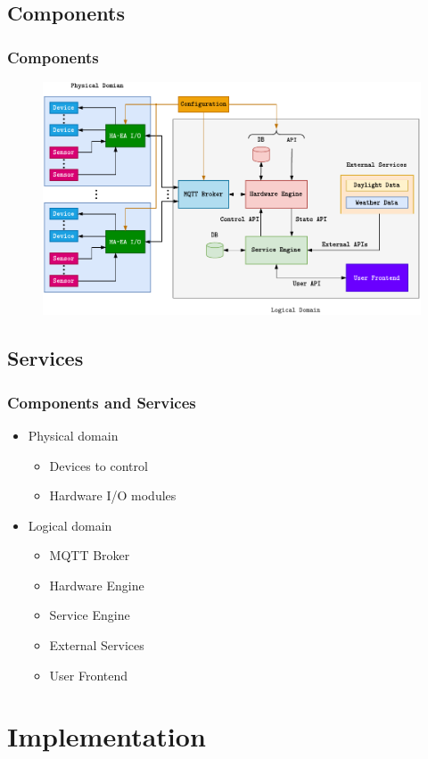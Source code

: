 \documentclass[aspectratio=169]{beamer}
\begin{document}
\subsection{Components}
\begin{frame}
\frametitle{Components}
\begin{figure}
\includegraphics[width=0.65\linewidth]{./figures/specification.pdf}
\end{figure}
\end{frame}

\subsection{Services}
\begin{frame}
\frametitle{Components and Services}
\begin{itemize}
\item Physical domain
\begin{itemize}
\item Devices to control
\item Hardware I/O modules
\end{itemize}
\item Logical domain
\begin{itemize}
\item MQTT Broker
\item Hardware Engine
\item Service Engine
\item External Services
\item User Frontend
\end{itemize}
\end{itemize}
\end{frame}


\section{Implementation}
\end{document}
